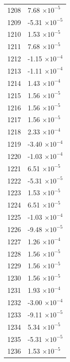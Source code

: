 \documentclass[a4paper,11pt]{article}
\begin{document}
\begin{center}
\begin{longtable}{|R{1.5cm}|R{2.5cm}|}
 1208 &         7.68 $\times 10^{          -5}$ \\
 1209 &        -5.31 $\times 10^{          -5}$ \\
 1210 &         1.53 $\times 10^{          -5}$ \\
 1211 &         7.68 $\times 10^{          -5}$ \\
 1212 &        -1.15 $\times 10^{          -4}$ \\
 1213 &        -1.11 $\times 10^{          -4}$ \\
 1214 &         1.43 $\times 10^{          -4}$ \\
 1215 &         1.56 $\times 10^{          -5}$ \\
 1216 &         1.56 $\times 10^{          -5}$ \\
 1217 &         1.56 $\times 10^{          -5}$ \\
 1218 &         2.33 $\times 10^{          -4}$ \\
 1219 &        -3.40 $\times 10^{          -4}$ \\
 1220 &        -1.03 $\times 10^{          -4}$ \\
 1221 &         6.51 $\times 10^{          -5}$ \\
 1222 &        -5.31 $\times 10^{          -5}$ \\
 1223 &         1.53 $\times 10^{          -5}$ \\
 1224 &         6.51 $\times 10^{          -5}$ \\
 1225 &        -1.03 $\times 10^{          -4}$ \\
 1226 &        -9.48 $\times 10^{          -5}$ \\
 1227 &         1.26 $\times 10^{          -4}$ \\
 1228 &         1.56 $\times 10^{          -5}$ \\
 1229 &         1.56 $\times 10^{          -5}$ \\
 1230 &         1.56 $\times 10^{          -5}$ \\
 1231 &         1.93 $\times 10^{          -4}$ \\
 1232 &        -3.00 $\times 10^{          -4}$ \\
 1233 &        -9.11 $\times 10^{          -5}$ \\
 1234 &         5.34 $\times 10^{          -5}$ \\
 1235 &        -5.31 $\times 10^{          -5}$ \\
 1236 &         1.53 $\times 10^{          -5}$ \\

\end{longtable}
\end{center}
\end{document}
